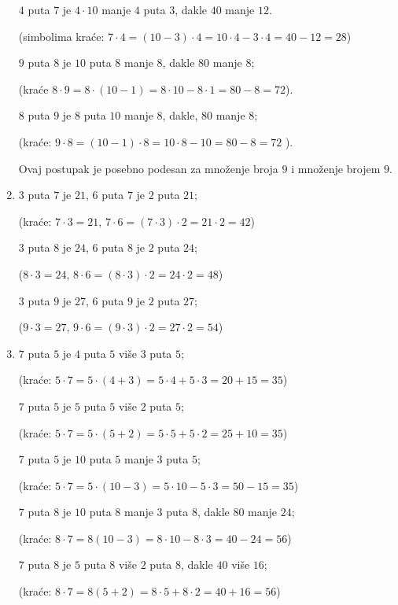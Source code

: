\begin{enumerate}
        $4$ puta $7$ je $4 \cdot 10$ manje $4$ puta $3$, dakle $40$ manje $12$.

        (simbolima kra\' ce: $7 \cdot 4 = (10 - 3) \cdot 4 = 10 \cdot 4 - 3 \cdot 4 = 40 - 12 = 28$)



        $9$ puta $8$ je $10$ puta $8$ manje $8$, dakle $80$ manje $8$;

        (kra\' ce $8 \cdot 9 = 8 \cdot (10 - 1) = 8 \cdot 10 - 8 \cdot 1 = 80 - 8 = 72$).



        $8$ puta $9$ je $8$ puta $10$ manje $8$, dakle, $80$ manje $8$;

        (kra\' ce: $9 \cdot 8 = (10 - 1) \cdot 8 = 10 \cdot 8 - 10 = 80 - 8 = 72$ ).



        Ovaj postupak je posebno podesan za mno\v zenje broja $9$ i mno\v zenje brojem $9$.

        \item $3$ puta $7$ je $21$, $6$ puta $7$ je $2$ puta $21$;

            (kra\' ce: $7 \cdot 3 = 21,\, 7 \cdot 6 = (7 \cdot 3) \cdot 2 = 21 \cdot 2 = 42$)

            

            $3$ puta $8$ je $24$, $6$ puta $8$ je $2$ puta $24$;

            ($8 \cdot 3 = 24,\, 8 \cdot 6 = (8 \cdot 3) \cdot 2 = 24 \cdot 2 = 48$)



            $3$ puta $9$ je $27$, $6$ puta $9$ je $2$ puta $27$;

            ($9 \cdot 3 = 27,\, 9 \cdot 6 = (9 \cdot 3) \cdot 2 = 27 \cdot 2 = 54$)

        \item $7$ puta $5$ je $4$ puta $5$ vi\v se $3$ puta $5$;

            (kra\' ce: $5 \cdot 7 = 5 \cdot (4 + 3) = 5 \cdot 4 + 5 \cdot 3 = 20 + 15 = 35$)



            $7$ puta $5$ je $5$ puta $5$ vi\v se $2$ puta $5$;

            (kra\' ce: $5 \cdot 7 = 5 \cdot (5 + 2) = 5 \cdot 5 + 5 \cdot 2 = 25 + 10 = 35$)



            $7$ puta $5$ je $10$ puta $5$ manje $3$ puta $5$;

            (kra\' ce: $5 \cdot 7 = 5 \cdot (10 - 3) = 5 \cdot 10 - 5 \cdot 3 = 50 - 15 = 35$)



            $7$ puta $8$ je $10$ puta $8$ manje $3$ puta $8$, dakle $80$ manje $24$;

            (kra\' ce: $8 \cdot 7 = 8(10 - 3) = 8 \cdot 10 - 8 \cdot 3 = 40 - 24 = 56$)



            $7$ puta $8$ je $5$ puta $8$ vi\v se $2$ puta $8$, dakle $40$ vi\v se $16$;

            (kra\' ce: $8 \cdot 7 = 8 (5 + 2) = 8 \cdot 5 + 8 \cdot 2 = 40 + 16 = 56$)

    \end{enumerate}

    

